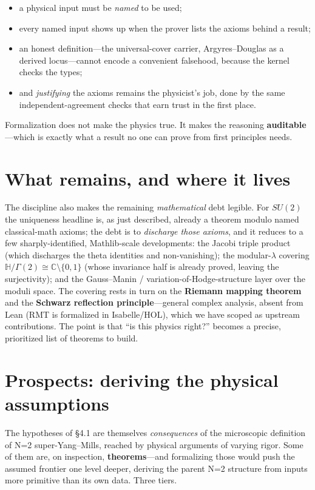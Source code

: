 \documentclass[11pt]{article}
\newcommand{\C}{\mathbb{C}}
\newcommand{\HH}{\mathbb{H}}
\begin{document}
\begin{itemize}
\item a physical input must be \emph{named} to be used;
\item every named input shows up when the prover lists the axioms behind a result;
\item an honest definition---the universal-cover carrier, Argyres--Douglas as a derived
locus---cannot encode a convenient falsehood, because the kernel checks the types;
\item and \emph{justifying} the axioms remains the physicist's job, done by the same
independent-agreement checks that earn trust in the first place.
\end{itemize}

Formalization does not make the physics true. It makes the reasoning \textbf{auditable}---which
is exactly what a result no one can prove from first principles needs.

\section{What remains, and where it lives}

The discipline also makes the remaining \emph{mathematical} debt legible. For $SU(2)$ the
uniqueness headline is, as just described, already a theorem modulo named classical-math
axioms; the debt is to \emph{discharge those axioms}, and it reduces to a few
sharply-identified, Mathlib-scale developments: the Jacobi triple product (which discharges the
theta identities and non-vanishing); the modular-$\lambda$ covering
$\HH/\Gamma(2)\cong\C\setminus\{0,1\}$ (whose invariance half is already proved, leaving the
surjectivity); and the Gauss--Manin / variation-of-Hodge-structure layer over the moduli space.
The covering rests in turn on the \textbf{Riemann mapping theorem} and the \textbf{Schwarz
reflection principle}---general complex analysis, absent from Lean (RMT is formalized in
Isabelle/HOL), which we have scoped as upstream contributions. The point is that ``is this
physics right?'' becomes a precise, prioritized list of theorems to build.

\section{Prospects: deriving the physical assumptions}

The hypotheses of \S4.1 are themselves \emph{consequences} of the microscopic definition of N=2
super-Yang--Mills, reached by physical arguments of varying rigor. Some of them are, on inspection,
\textbf{theorems}---and formalizing those would push the assumed frontier one level deeper, deriving
the parent N=2 structure from inputs more primitive than its own data. Three tiers.
\end{document}
